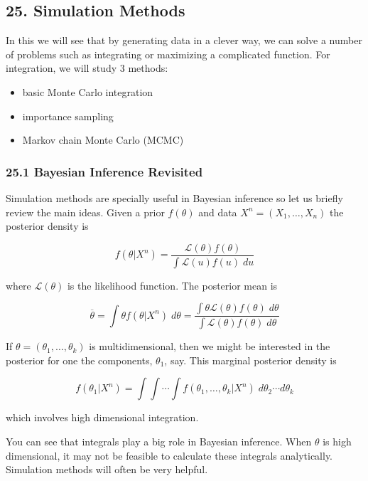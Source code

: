 \subsection{25. Simulation Methods}\label{simulation-methods}

In this we will see that by generating data in a clever way, we can
solve a number of problems such as integrating or maximizing a
complicated function. For integration, we will study 3 methods:

\begin{itemize}[tightlist]
\item
  basic Monte Carlo integration
\item
  importance sampling
\item
  Markov chain Monte Carlo (MCMC)
\end{itemize}

\subsubsection{25.1 Bayesian Inference Revisited}\label{bayesian-inference-revisited}

Simulation methods are specially useful in Bayesian inference so let us
briefly review the main ideas. Given a prior \(f(\theta)\) and data
\(X^n = (X_1, \dots, X_n)\) the posterior density is

\[ f(\theta | X^n) = \frac{\mathcal{L}(\theta) f(\theta)}{ \int \mathcal{L}(u) f(u) \; du} \]

where \(\mathcal{L}(\theta)\) is the likelihood function. The posterior
mean is

\[ \overline{\theta} = \int \theta f(\theta | X^n) \; d\theta = \frac{\int \theta \mathcal{L}(\theta) f(\theta) \; d\theta}{\int \mathcal{L}(\theta) f(\theta) \; d\theta} \]

If \(\theta = (\theta_1, \dots, \theta_k)\) is multidimensional, then we
might be interested in the posterior for one the components,
\(\theta_1\), say. This marginal posterior density is

\[ f(\theta_1 | X^n) = \int \int \cdots \int f(\theta_1, \dots, \theta_k | X^n) \; d\theta_2 \cdots d\theta_k\]

which involves high dimensional integration.

You can see that integrals play a big role in Bayesian inference. When
\(\theta\) is high dimensional, it may not be feasible to calculate
these integrals analytically. Simulation methods will often be very
helpful.


